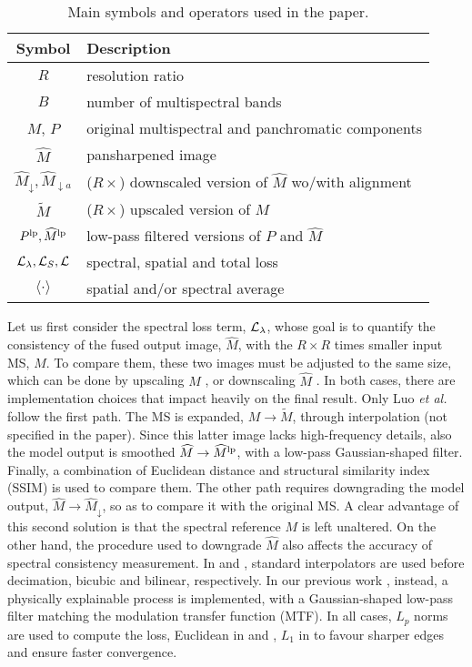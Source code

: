 \documentclass[journal]{IEEEtran}
\newcommand{\hM} {\widehat{M}}
\newcommand{\hMd}{\widehat{M}_\downarrow}
\newcommand{\hMa}{\widehat{M}_{{\downarrow}{a}}}
\newcommand{\tM} {\widetilde{M}}
\newcommand{\Plp}{P^{\rm lp}}
\newcommand{\hMlp} {\hM^{\rm lp}}
\newcommand{\LL}{{\cal L}}
\begin{document}
\begin{table}[t]
\centering
\begin{tabular}{cl}
\hline
\textbf{Symbol}            & \textbf{Description}\\\hline
$R$                        & resolution ratio \\
$B$                        & number of multispectral bands \\
$M$, $P$                   & original multispectral and panchromatic components \\
$\hM$                      & pansharpened image \\
$\hM_\downarrow,\hMa$      & ($R{\times}$) downscaled version of $\hM$ wo/with alignment \\
$\tM$                      & ($R{\times}$) upscaled version of $M$ \\
$\Plp, \hMlp$              & low-pass filtered versions of $P$ and $\hM$ \\
$\LL_\lambda, \LL_S, \LL$  & spectral, spatial and total loss \\
$\langle \cdot \rangle$    & spatial and/or spectral average \\
\hline
\end{tabular}
\caption{Main symbols and operators used in the paper.}
\label{tab:Symbols}
\end{table}

Let us first consider the spectral loss term, $\LL_\lambda$,
whose goal is to quantify the consistency of the fused output image, $\hM$,
with the $R{\times}R$ times smaller input MS, $M$.
To compare them, these two images must be adjusted to the same size,
which can be done by upscaling $M$ \cite{Luo2020}, or downscaling $\hM$ \cite{Uezato2020, Ma2020, Ciotola2022}.
In both cases, there are implementation choices that impact heavily on the final result.
Only Luo {\em et al.} \cite{Luo2020} follow the first path.
The MS is expanded, $M \to \widetilde{M}$, through interpolation (not specified in the paper).
Since this latter image lacks high-frequency details, also the model output is smoothed $\hM \to \hM^{\rm lp}$,
with a low-pass Gaussian-shaped filter. Finally, a combination of Euclidean distance and structural similarity index (SSIM) is used to compare them.
The other path requires downgrading the model output, $\hM \to \hMd$, so as to compare it with the original MS.
A clear advantage of this second solution is that the spectral reference $M$ is left unaltered.
On the other hand, the procedure used to downgrade $\hM$ also affects the accuracy of spectral consistency measurement.
In \cite{Uezato2020} and \cite{Ma2020}, standard interpolators are used before decimation, bicubic and bilinear, respectively.
In our previous work \cite{Ciotola2022}, instead,
a physically explainable process is implemented, with a Gaussian-shaped low-pass filter matching the modulation transfer function (MTF).
In all cases, $L_p$ norms are used to compute the loss,
Euclidean in \cite{Uezato2020} and \cite{Ma2020},
$L_1$ in \cite{Ciotola2022} to favour sharper edges and ensure faster convergence.
\end{document}
